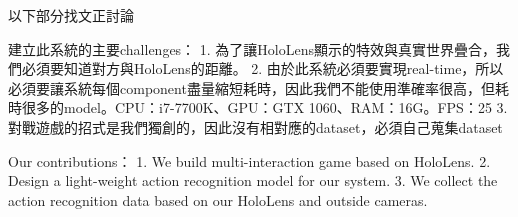 以下部分找文正討論

建立此系統的主要challenges：
1. 為了讓HoloLens顯示的特效與真實世界疊合，我們必須要知道對方與HoloLens的距離。
2. 由於此系統必須要實現real-time，所以必須要讓系統每個component盡量縮短耗時，因此我們不能使用準確率很高，但耗時很多的model。CPU：i7-7700K、GPU：GTX 1060、RAM：16G。FPS：25
3. 對戰遊戲的招式是我們獨創的，因此沒有相對應的dataset，必須自己蒐集dataset

Our contributions：
1. We build multi-interaction game based on HoloLens.
2. Design a light-weight action recognition model for our system.
3. We collect the action recognition data based on our HoloLens and outside cameras.

\EndChapter
